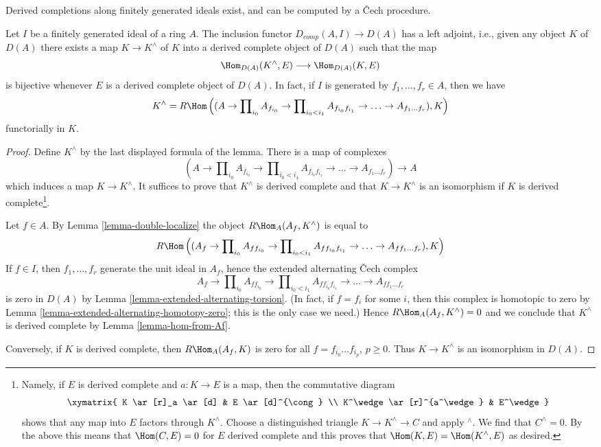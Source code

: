 \begin{lemma}
\label{lemma-derived-completion}
\begin{slogan}
Derived completions along finitely generated ideals exist, and can
be computed by a {\v C}ech procedure.
\end{slogan}
Let $I$ be a finitely generated ideal of a ring $A$.
The inclusion functor $D_{comp}(A, I) \to D(A)$ has a
left adjoint, i.e., given any object $K$ of $D(A)$ there
exists a map $K \to K^\wedge$ of $K$ into a derived complete
object of $D(A)$ such that the map
$$
\Hom_{D(A)}(K^\wedge, E) \longrightarrow \Hom_{D(A)}(K, E)
$$
is bijective whenever $E$ is a derived complete object of $D(A)$.
In fact, if $I$ is generated by $f_1, \ldots, f_r \in A$, then we have
$$
K^\wedge = R\Hom\left((A \to \prod\nolimits_{i_0} A_{f_{i_0}} \to
\prod\nolimits_{i_0 < i_1} A_{f_{i_0}f_{i_1}}
\to \ldots \to A_{f_1\ldots f_r}), K\right)
$$
functorially in $K$.
\end{lemma}

\begin{proof}
Define $K^\wedge$ by the last displayed formula of the lemma.
There is a map of complexes
$$
(A \to \prod\nolimits_{i_0} A_{f_{i_0}} \to
\prod\nolimits_{i_0 < i_1} A_{f_{i_0}f_{i_1}} \to
\ldots \to A_{f_1\ldots f_r}) \longrightarrow A
$$
which induces a map $K \to K^\wedge$. It suffices to prove that
$K^\wedge$ is derived complete and that $K \to K^\wedge$ is an
isomorphism if $K$ is derived complete\footnote{Namely, if $E$
is derived complete and $a : K \to E$ is a map, then the
commutative diagram
$$
\xymatrix{
K \ar[r]_a \ar[d] & E \ar[d]^{\cong} \\
K^\wedge \ar[r]^{a^\wedge} & E^\wedge
}
$$
shows that any map into $E$ factors through $K^\wedge$.
Choose a distinguished triangle $K \to K^\wedge \to C$ and apply
${}^\wedge$. We find that $C^\wedge = 0$.
By the above this means that $\Hom(C, E) = 0$ for $E$ derived complete
and this proves that $\Hom(K, E) = \Hom(K^\wedge, E)$ as desired.}.

\medskip\noindent
Let $f \in A$. By Lemma \ref{lemma-double-localize}
the object $R\Hom_A(A_f, K^\wedge)$ is equal to
$$
R\Hom\left((A_f \to \prod\nolimits_{i_0} A_{ff_{i_0}} \to
\prod\nolimits_{i_0 < i_1} A_{ff_{i_0}f_{i_1}} \to
\ldots \to A_{ff_1\ldots f_r}), K\right)
$$
If $f \in I$, then $f_1, \ldots, f_r$ generate the
unit ideal in $A_f$, hence the extended alternating
{\v C}ech complex
$$
A_f \to \prod\nolimits_{i_0} A_{ff_{i_0}} \to
\prod\nolimits_{i_0 < i_1} A_{ff_{i_0}f_{i_1}} \to
\ldots \to A_{ff_1\ldots f_r}
$$
is zero in $D(A)$ by
Lemma \ref{lemma-extended-alternating-torsion}.
(In fact, if $f = f_i$ for some $i$, then this complex
is homotopic to zero by
Lemma \ref{lemma-extended-alternating-homotopy-zero};
this is the only case we need.)
Hence $R\Hom_A(A_f, K^\wedge) = 0$ and we conclude that
$K^\wedge$ is derived complete by Lemma \ref{lemma-hom-from-Af}.

\medskip\noindent
Conversely, if $K$ is derived complete, then $R\Hom_A(A_f, K)$
is zero for all $f = f_{i_0} \ldots f_{i_p}$, $p \geq 0$. Thus
$K \to K^\wedge$ is an isomorphism in $D(A)$.
\end{proof}